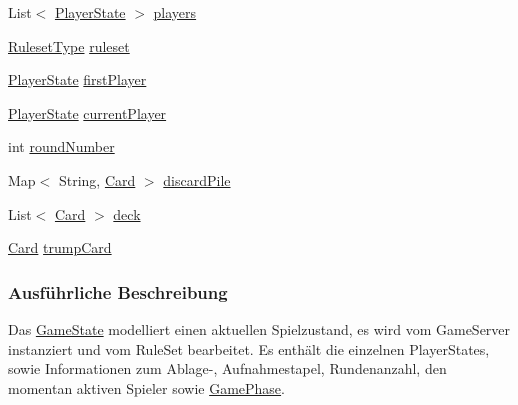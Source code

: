 \begin{DoxyCompactItemize}
\item 
\hypertarget{a00061_a120484700dc038c2db89f27b296aa311}{List$<$ \hyperlink{a00065}{Player\-State} $>$ \hyperlink{a00061_a120484700dc038c2db89f27b296aa311}{players}}\label{a00061_a120484700dc038c2db89f27b296aa311}

\item 
\hypertarget{a00061_ab1a0de7ba523f1538143a3924bc5db91}{\hyperlink{a00066}{Ruleset\-Type} \hyperlink{a00061_ab1a0de7ba523f1538143a3924bc5db91}{ruleset}}\label{a00061_ab1a0de7ba523f1538143a3924bc5db91}

\item 
\hypertarget{a00061_a4092f0a890d990421ea0f83f5fe0e3cf}{\hyperlink{a00065}{Player\-State} \hyperlink{a00061_a4092f0a890d990421ea0f83f5fe0e3cf}{first\-Player}}\label{a00061_a4092f0a890d990421ea0f83f5fe0e3cf}

\item 
\hypertarget{a00061_aa84e85401d48f310ee9959621f6c4fba}{\hyperlink{a00065}{Player\-State} \hyperlink{a00061_aa84e85401d48f310ee9959621f6c4fba}{current\-Player}}\label{a00061_aa84e85401d48f310ee9959621f6c4fba}

\item 
\hypertarget{a00061_aecea0a747a4fc4236a235dc5b849779b}{int \hyperlink{a00061_aecea0a747a4fc4236a235dc5b849779b}{round\-Number}}\label{a00061_aecea0a747a4fc4236a235dc5b849779b}

\item 
\hypertarget{a00061_abf51aa3b896825ac08fa574e68701e86}{Map$<$ String, \hyperlink{a00054}{Card} $>$ \hyperlink{a00061_abf51aa3b896825ac08fa574e68701e86}{discard\-Pile}}\label{a00061_abf51aa3b896825ac08fa574e68701e86}

\item 
\hypertarget{a00061_ada90d280bf05807755067241c0c120b1}{List$<$ \hyperlink{a00054}{Card} $>$ \hyperlink{a00061_ada90d280bf05807755067241c0c120b1}{deck}}\label{a00061_ada90d280bf05807755067241c0c120b1}

\item 
\hypertarget{a00061_ab25322829797b0de34227a8e2cdb1929}{\hyperlink{a00054}{Card} \hyperlink{a00061_ab25322829797b0de34227a8e2cdb1929}{trump\-Card}}\label{a00061_ab25322829797b0de34227a8e2cdb1929}

\end{DoxyCompactItemize}


\subsubsection{Ausführliche Beschreibung}
Das \hyperlink{a00061}{Game\-State} modelliert einen aktuellen Spielzustand, es wird vom Game\-Server instanziert und vom Rule\-Set bearbeitet. Es enthält die einzelnen Player\-States, sowie Informationen zum Ablage-\/, Aufnahmestapel, Rundenanzahl, den momentan aktiven Spieler sowie \hyperlink{a00060}{Game\-Phase}. 

